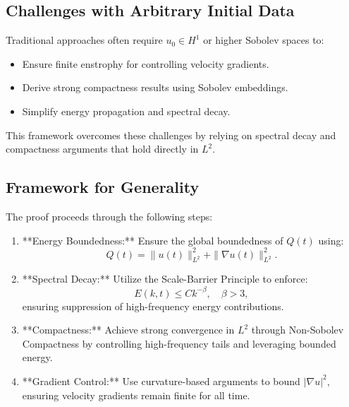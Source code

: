\documentclass[12pt]{article}
\theoremstyle{definition}
\begin{document}
\subsection{Challenges with Arbitrary Initial Data}

Traditional approaches often require $u_0 \in H^1$ or higher Sobolev spaces to:
\begin{itemize}
    \item Ensure finite enstrophy for controlling velocity gradients.
    \item Derive strong compactness results using Sobolev embeddings.
    \item Simplify energy propagation and spectral decay.
\end{itemize}
This framework overcomes these challenges by relying on spectral decay and compactness arguments that hold directly in $L^2$.

\subsection{Framework for Generality}

The proof proceeds through the following steps:
\begin{enumerate}
    \item **Energy Boundedness:** Ensure the global boundedness of $Q(t)$ using:
    \begin{equation}
    Q(t) = \|u(t)\|_{L^2}^2 + \|\nabla u(t)\|_{L^2}^2.
    \end{equation}
    \item **Spectral Decay:** Utilize the Scale-Barrier Principle to enforce:
    \begin{equation}
    E(k, t) \leq C k^{-\beta}, \quad \beta > 3,
    \end{equation}
    ensuring suppression of high-frequency energy contributions.
    \item **Compactness:** Achieve strong convergence in $L^2$ through Non-Sobolev Compactness by controlling high-frequency tails and leveraging bounded energy.
    \item **Gradient Control:** Use curvature-based arguments to bound $|\nabla u|^2$, ensuring velocity gradients remain finite for all time.
\end{enumerate}
\end{document}
